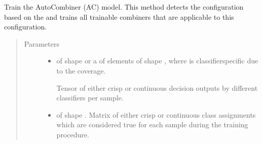 \documentclass[letterpaper,10pt,english]{sphinxmanual}
\begin{document}
\begin{fulllineitems}
\begin{fulllineitems}
\label{\detokenize{pusion.auto.auto_combiner:pusion.auto.auto_combiner.AutoCombiner.train}}
\sphinxAtStartPar
Train the AutoCombiner (AC) model. This method detects the configuration based on the  and
trains all trainable combiners that are applicable to this configuration.
\begin{quote}\begin{description}
\item[{Parameters}] \leavevmode\begin{itemize}
\item {} 
\sphinxAtStartPar
{} \textendash{} 
\sphinxAtStartPar
{} of shape  or a  of
 elements of shape , where  is classifier\sphinxhyphen{}specific
due to the coverage.

\sphinxAtStartPar
Tensor of either crisp or continuous decision outputs by different classifiers per sample.


\item {} 
\sphinxAtStartPar
{} \textendash{}  of shape .
Matrix of either crisp or continuous class assignments which are considered true for each sample during
the training procedure.

\end{itemize}

\end{description}\end{quote}

\end{fulllineitems}



\end{fulllineitems}
\end{document}
